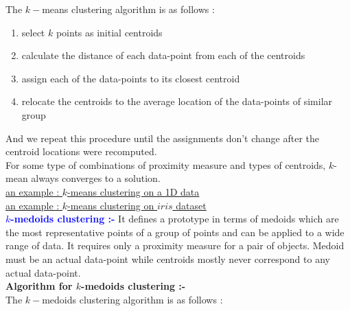 \documentclass[11pt, a4paper]{article}
\begin{document}
The $k-$means clustering algorithm is as follows :

\begin{enumerate}[(1)]
\item select $k$ points as initial centroids
\item calculate the distance of each data-point from each of the centroids
\item assign each of the data-points to its closest centroid
\item relocate the centroids to the average location of the data-points of similar group
\end{enumerate}

And we repeat this procedure until the assignments don't change after the centroid locations were recomputed. \\

For some type of combinations of proximity measure and types of centroids, $k$-mean always converges to a solution. \\

 \hspace{0.5cm} \href{https://github.com/sakunisgithub/R-programming/blob/master/msc_sem_2_practicals/rakesh_sir_practicals/practical_01/practical_01.pdf}{\underline{an example : $k$-means clustering on a 1D data}} \\

 \hspace{0.5cm} \href{https://github.com/sakunisgithub/R-programming/blob/master/msc_sem_2_practicals/rakesh_sir_practicals/practical_02/practical_02.pdf}{\underline{an example : $k$-means clustering on $iris$ dataset}} \\

\leftpointright \hspace{0.2cm} \textbf{\textcolor{blue}{$k$-medoids clustering :-}} It defines a prototype in terms of medoids which are the most representative points of a group of points and can be applied to a wide range of data. It requires only a proximity measure for a pair of objects. Medoid must be an actual data-point while centroids mostly never correspond to any actual data-point. \\

\faArrowAltCircleRight[regular] \hspace{0.2cm} \textbf{Algorithm for $k$-medoids clustering :-} \\

The $k-$medoids clustering algorithm is as follows :
\end{document}
